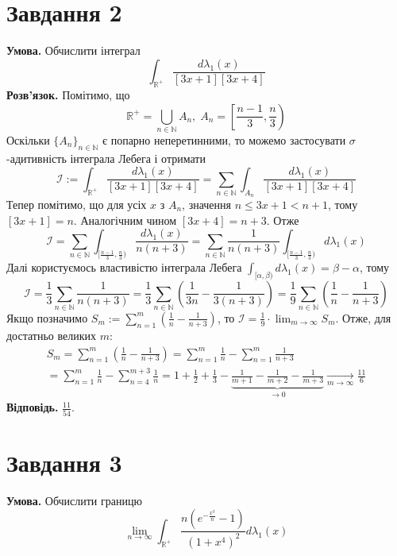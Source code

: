\documentclass[14pt]{extarticle}
\begin{document}
\section*{Завдання 2}
\textbf{Умова.} Обчислити інтеграл
\[
\int_{\mathbb{R}^+} \frac{d\lambda_1(x)}{[3x+1][3x+4]}
\]
\textbf{Розв'язок.} Помітимо, що
\[
\mathbb{R}^+ = \bigcup_{n \in \mathbb{N}} A_n, \; A_n = \left[\frac{n-1}{3},\frac{n}{3}\right)
\]
Оскільки $\{A_n\}_{n \in \mathbb{N}}$ є попарно неперетинними, то можемо застосувати $\sigma$-адитивність інтеграла Лебега і отримати
\[
\mathcal{I} := \int_{\mathbb{R}^+}\frac{d\lambda_1(x)}{[3x+1][3x+4]} = \sum_{n \in \mathbb{N}}\int_{A_n} \frac{d\lambda_1(x)}{[3x+1][3x+4]}
\]
Тепер помітимо, що для усіх $x$ з $A_n$, значення $n \leq 3x+1 < n+1$, тому $[3x+1]=n$. Аналогічним чином $[3x+4]=n+3$. Отже
\[
\mathcal{I} = \sum_{n \in \mathbb{N}} \int_{[\frac{n-1}{3},\frac{n}{3})} \frac{d\lambda_1(x)}{n(n+3)} = \sum_{n \in \mathbb{N}} \frac{1}{n(n+3)}\int_{[\frac{n-1}{3},\frac{n}{3})}d\lambda_1(x)
\]
Далі користуємось властивістю інтеграла Лебега $\int_{[\alpha,\beta)}d\lambda_1(x)=\beta-\alpha$, тому
\[
\mathcal{I} = \frac{1}{3}\sum_{n \in \mathbb{N}}\frac{1}{n(n+3)} = \frac{1}{3}\sum_{n \in \mathbb{N}}\left(\frac{1}{3n}-\frac{1}{3(n+3)}\right) = \frac{1}{9}\sum_{n \in \mathbb{N}}\left(\frac{1}{n}-\frac{1}{n+3}\right)
\]
Якщо позначимо $S_m := \sum_{n=1}^{m}\left(\frac{1}{n}-\frac{1}{n+3}\right)$, то $\mathcal{I} = \frac{1}{9}\cdot\lim_{m \to \infty}S_m$. Отже, для достатньо великих $m$:
\begin{gather*}
S_m = \sum_{n=1}^m \left(\frac{1}{n}-\frac{1}{n+3}\right) = \sum_{n=1}^m \frac{1}{n} - \sum_{n=1}^m \frac{1}{n+3}\\
= \sum_{n=1}^m \frac{1}{n} - \sum_{n=4}^{m+3} \frac{1}{n} = 1 + \frac{1}{2} + \frac{1}{3} - \underbrace{\frac{1}{m+1}-\frac{1}{m+2}-\frac{1}{m+3}}_{\to 0} \xrightarrow[m \to \infty]{} \frac{11}{6}
\end{gather*}
\textbf{Відповідь.} $\frac{11}{54}$.

\section*{Завдання 3}

\textbf{Умова.} Обчислити границю
\[
\lim_{n \to \infty} \int_{\mathbb{R}^+} \frac{n\left(e^{-\frac{x^3}{n}}-1\right)}{(1+x^4)^2}d\lambda_1(x)
\]
\end{document}
